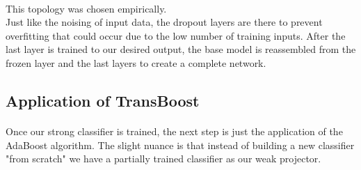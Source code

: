 \documentclass[11 pt]{article}
\begin{document}
\medskip

\paragraph{}This topology was chosen empirically.\\


Just like the noising of input data, the dropout layers are there to prevent overfitting that could occur due to the low number of training inputs. 
After the last layer is trained to our desired output, the base model is reassembled from the frozen layer and the last layers to create a complete network.

\subsection{Application of TransBoost}

\paragraph{} Once our strong classifier is trained, the next step is just the application of the AdaBoost algorithm. The slight nuance is that instead of building a new classifier "from scratch" we have a partially trained classifier as our weak projector. 
\end{document}

